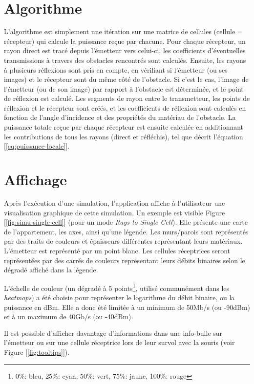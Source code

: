 \section{Algorithme}
L'algorithme est simplement une itération sur une matrice de cellules (cellule = récepteur) qui calcule la puissance reçue par chacune. Pour chaque récepteur, un rayon direct est tracé depuis l'émetteur vers celui-ci, les coefficients d'éventuelles transmissions à travers des obstacles rencontrés sont calculés. Ensuite, les rayons à plusieurs réflexions sont pris en compte, en vérifiant si l'émetteur (ou ses images) et le récepteur sont du même côté de l'obstacle. Si c'est le cas, l'image de l'émetteur (ou de son image) par rapport à l'obstacle est déterminée, et le point de réflexion est calculé. Les segments de rayon entre le transmetteur, les points de réflexion et le récepteur sont créés, et les coefficients de réflexion sont calculés en fonction de l'angle d'incidence et des propriétés du matériau de l'obstacle. La puissance totale reçue par chaque récepteur est ensuite calculée en additionnant les contributions de tous les rayons (direct et réfléchis), tel que décrit l'équation [\ref{eq:puissance-locale}].

\section{Affichage}
Après l'exécution d'une simulation, l'application affiche à l'utilisateur une visualisation graphique de cette simulation. Un exemple est visible Figure [\ref{fig:simu-single-cell}] (pour un mode \textit{Rays to Single Cell}). Elle présente une carte de l'appartement, les axes, ainsi qu'une légende. Les murs/parois sont représentés par des traits de couleurs et épaisseurs différentes représentant leurs matériaux. L'émetteur est représenté par un point blanc. Les cellules réceptrices seront représentées par des carrés de couleurs représentant leurs débits binaires selon le dégradé affiché dans la légende.

L'échelle de couleur (un dégradé à 5 points\footnote{0\%: bleu, 25\%: cyan, 50\%: vert, 75\%: jaune, 100\%: rouge}, utilisé communément dans les \textit{heatmaps}) a été choisie pour représenter le logarithme du débit binaire, ou la puissance en dBm. Elle a donc été limitée à un minimum de 50Mb/s (ou -90dBm) et à un maximum de 40Gb/s (ou -40dBm).

Il est possible d'afficher davantage d'informations dans une info-bulle sur l'émetteur ou sur une cellule réceptrice lors de leur survol avec la souris (voir Figure [\ref{fig:tooltips}]).

